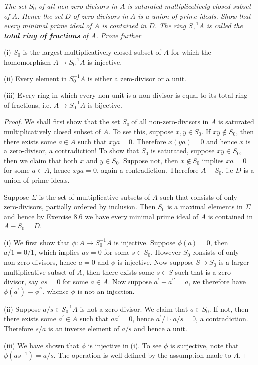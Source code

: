 \begin{problem}\em
The set $S_0$ of all non-zero-divisors in $A$ is saturated multiplicatively closed subset of $A$. Hence the set $D$ of zero-divisors in $A$ is a union of prime ideals. Show that every minimal prime ideal of $A$ is contained in $D$. The ring $S_0^{-1}A$ is called the \textbf{total ring of fractions} of $A$. Prove further\par
(i) $S_0$ is the largest multiplicatively closed subset of $A$ for which the homomorphism $A\to S_0^{-1}A$ is injective.\par
(ii) Every element in $S_0^{-1}A$ is either a zero-divisor or a unit.\par
(iii) Every ring in which every non-unit is a non-divisor is equal to its total ring of fractions, i.e. $A\to S_0^{-1}A$ is bijective.
\end{problem}
\begin{proof}
We shall first show that the set $S_0$ of all non-zero-divisors in $A$ is saturated multiplicatively closed subset of $A$. To see this, suppose $x,y\in S_0$. If $xy\notin S_0$, then there exists some $a\in A$ such that $xya=0$. Therefore $x(ya)=0$ and hence $x$ is a zero-divisor, a contradiction! To show that $S_0$ is saturated, suppose $xy\in S_0$, then we claim that both $x$ and $y\in S_0$. Suppose not, then $x\notin S_0$ implies $xa=0$ for some $a\in A$, hence $xya=0$, again a contradiction. Therefore $A-S_0$, i.e $D$ is a union of prime ideals.\par
Suppose $\Sigma$ is the set of multiplicative subsets of $A$ such that consists of only zero-divisors, partially ordered by inclusion. Then $S_0$ is a maximal elements in $\Sigma$ and hence by Exercise 8.6 we have every minimal prime ideal of $A$ is contained in $A-S_0=D$.\par
(i) We first show that $\phi:A\to S_0^{-1}A$ is injective. Suppose $\phi(a)=0$, then $a/1=0/1$, which implies $as=0$ for some $s\in S_0$. However $S_0$ consists of only non-zero-divisors, hence $a=0$ and $\phi$ is injective. Now suppose $S\supset S_0$ is a larger multiplicative subset of $A$, then there exists some $s\in S$ such that is a zero-divisor, say $as=0$ for some $a\in A$. Now suppose $a^\prime-a^{\prime\prime}=a$, we therefore have $\phi(a^\prime)=\phi^{\prime\prime}$, whence $\phi$ is not an injection.\par
(ii) Suppose $a/s\in S_0^{-1}A$ is not a zero-divisor. We claim that $a\in S_0$. If not, then there exists some $a^\prime\in A$ such that $aa^\prime=0$, hence $a^\prime/1\cdot a/s=0$, a contradiction. Therefore $s/a$ is an inverse element of $a/s$ and hence a unit.\par
(iii) We have shown that $\phi$ is injective in (i). To see $\phi$ is surjective, note that $\phi(as^{-1})=a/s$. The operation is well-defined by the assumption made to $A$.
\end{proof}
